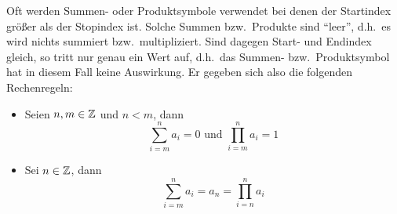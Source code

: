 Oft werden Summen- oder Produktsymbole verwendet bei denen der Startindex 
größer als der Stopindex ist. Solche Summen bzw.~Produkte sind "`leer"', 
d.h.~es wird nichts summiert bzw.~multipliziert. Sind dagegen Start- und
Endindex gleich, so tritt nur genau ein Wert auf, d.h.~das Summen- 
bzw.~Produktsymbol hat in diesem Fall keine Auswirkung. Er gegeben sich
also die folgenden Rechenregeln:
\begin{itemize}
%
\item Seien $n, m \in \mathbb Z$ und $n < m$, dann 
\begin{displaymath}
\sum_{i=m}^n a_i = 0  \text{ und } \prod_{i = m}^n a_i = 1
\end{displaymath}
%
\item Sei $n \in \mathbb Z$, dann 
\begin{displaymath}
\sum_{i=m}^n a_i = a_n = \prod_{i = n}^n a_i
\end{displaymath}
\end{itemize}


